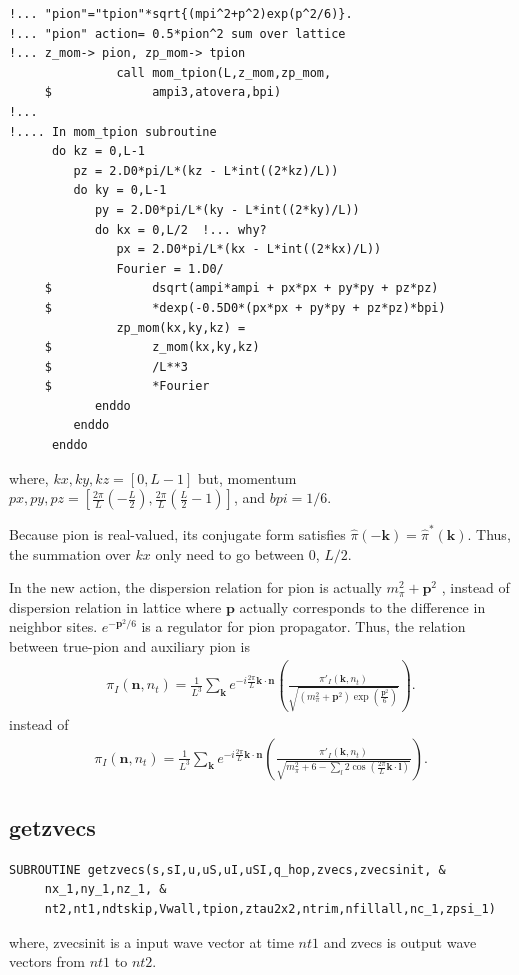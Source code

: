 \documentclass[10pt]{book}
\def\bm{\boldsymbol}
\newcommand{\bea}{\begin{eqnarray}}
\newcommand{\eea}{\end{eqnarray}}
\def\vk{{\bm k}}
\def\vl{{\bm l}}
\def\vn{{\bm n}}
\def\vp{{\bm p}}
\begin{document}
\begin{lstlisting}[frame=single]
!... "pion"="tpion"*sqrt{(mpi^2+p^2)exp(p^2/6)}.
!... "pion" action= 0.5*pion^2 sum over lattice
!... z_mom-> pion, zp_mom-> tpion
               call mom_tpion(L,z_mom,zp_mom,
     $              ampi3,atovera,bpi)
!...
!.... In mom_tpion subroutine 
      do kz = 0,L-1
         pz = 2.D0*pi/L*(kz - L*int((2*kz)/L))
         do ky = 0,L-1
            py = 2.D0*pi/L*(ky - L*int((2*ky)/L))
            do kx = 0,L/2  !... why?
               px = 2.D0*pi/L*(kx - L*int((2*kx)/L))
               Fourier = 1.D0/
     $              dsqrt(ampi*ampi + px*px + py*py + pz*pz)
     $              *dexp(-0.5D0*(px*px + py*py + pz*pz)*bpi)               
               zp_mom(kx,ky,kz) =
     $              z_mom(kx,ky,kz)
     $              /L**3
     $              *Fourier
            enddo
         enddo
      enddo
\end{lstlisting}  
where, $kx,ky,kz=[0,L-1]$ but, momentum 
$px,py,pz=[\frac{2\pi}{L}(-\frac{L}{2}),\frac{2\pi}{L}(\frac{L}{2}-1)]$,
and $bpi=1/6$. 

Because pion is real-valued, its conjugate form satisfies 
$\hat{\pi}(-\vk)=\hat{\pi}^*(\vk)$. Thus, the summation over $kx$ only 
need to go between 0, $L/2$.  

In the new action, the dispersion relation for pion 
is actually $m_\pi^2+\vp^2$ ,
instead of dispersion relation in lattice where $\vp$
actually corresponds to the difference in neighbor sites. 
$e^{-\vp^2/6}$ is a regulator for  pion propagator. 
Thus, the relation between true-pion and auxiliary pion is 
\bea 
\pi_I(\vn,n_t)=\frac{1}{L^3}\sum_{\vk}e^{-i\frac{2\pi}{L} \vk\cdot\vn}
\left( \frac{\pi'_I(\vk,n_t)}
{\sqrt{ (m_\pi^2+\vp^2)\exp(\frac{\vp^2}{6})} }
\right). 
\eea  
instead of
\bea 
\pi_I(\vn,n_t)=\frac{1}{L^3}\sum_{\vk}e^{-i\frac{2\pi}{L} \vk\cdot\vn}
               \left( \frac{\pi'_I(\vk,n_t)}
               {\sqrt{ m_\pi^2+6-\sum_{l}2\cos(\frac{2\pi}{L}\vk\cdot\vl)}}
               \right). 
\eea  

\subsection{ getzvecs }

\begin{lstlisting}[frame=single]
SUBROUTINE getzvecs(s,sI,u,uS,uI,uSI,q_hop,zvecs,zvecsinit, &
     nx_1,ny_1,nz_1, &
     nt2,nt1,ndtskip,Vwall,tpion,ztau2x2,ntrim,nfillall,nc_1,zpsi_1)
\end{lstlisting}  
where, zvecsinit is a input wave vector at time $nt1$ and zvecs is
output wave vectors from $nt1$ to $nt2$.
\end{document}
